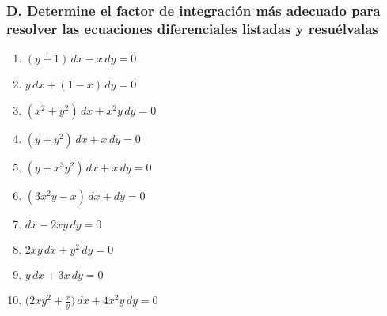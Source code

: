 \documentclass[a4paper,12pt]{article}
\begin{document}
\subsubsection*{D. Determine el factor de integración más adecuado para resolver las ecuaciones diferenciales listadas y resuélvalas}

\begin{enumerate}
  \item $(y+1)\, dx - x\, dy = 0$ 
\item $y\, dx + (1-x)\, dy = 0$ 
\item $(x^2+y^2)\, dx + x^2y\, dy = 0$ 
\item $(y+y^2)\, dx + x\, dy = 0$
\item $(y+x^3y^2)\, dx + x\, dy = 0$ 
\item $(3x^2y-x)\, dx + dy = 0$
\item $dx - 2xy\, dy = 0$
\item $2xy\, dx + y^2\, dy = 0$
\item $y\, dx + 3x\, dy = 0$
\item $\Big(2xy^2 + \tfrac{x}{y}\Big)\, dx + 4x^2y\, dy = 0$
\end{enumerate}
\end{document}
